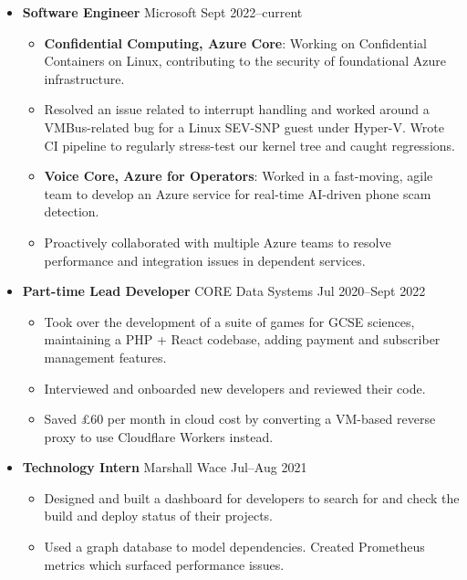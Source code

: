   \begin{itemize}
    \item \textbf{Software Engineer} %
    \dashdiv{} Microsoft \dashdiv{} Sept 2022--current

    \begin{itemize}
      \item \textbf{Confidential Computing, Azure Core}: Working on Confidential Containers on Linux, contributing to the security of foundational Azure infrastructure.
      \item Resolved an issue related to interrupt handling and worked around a VMBus-related bug for a Linux SEV-SNP guest under Hyper-V. Wrote CI pipeline to regularly stress-test our kernel tree and caught regressions.
    \end{itemize}

    \begin{itemize}
      \item \textbf{Voice Core, Azure for Operators}: Worked in a fast-moving, agile team to develop an Azure service for real-time AI-driven phone scam detection.
      \item Proactively collaborated with multiple Azure teams to resolve performance and integration issues in dependent services.
    \end{itemize}

    \item \textbf{Part-time Lead Developer} \dashdiv{} CORE Data Systems \dashdiv{} Jul 2020--Sept 2022

    \begin{itemize}
      \item Took over the development of a suite of games for GCSE sciences, maintaining a PHP + React codebase, adding payment and subscriber management features.
      \item Interviewed and onboarded new developers and reviewed their code.
      \item Saved £60 per month in cloud cost by converting a VM-based reverse proxy to use Cloudflare Workers instead.
    \end{itemize}

    \item \textbf{Technology Intern} \dashdiv{} Marshall Wace \dashdiv{} Jul--Aug 2021

    \begin{itemize}
      \item Designed and built a dashboard for developers to search for and check the build and deploy status of their projects.
      \item Used a graph database to model dependencies. Created Prometheus metrics which surfaced performance issues.
    \end{itemize}
  \end{itemize}


